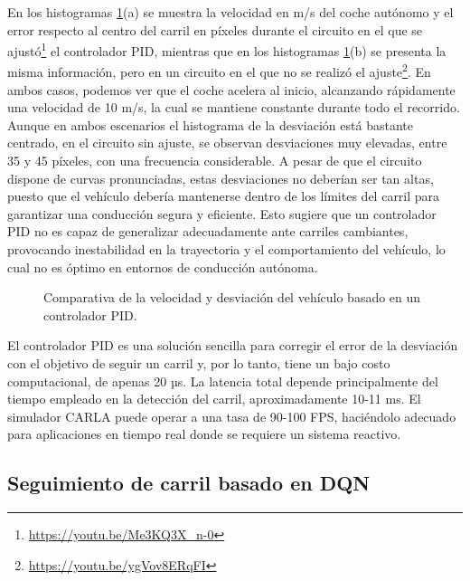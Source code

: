 En los histogramas \ref{fig:comparativa_pid}(a) se muestra la velocidad en m/s del coche autónomo y el error respecto al centro del carril en píxeles durante el circuito en el que se ajustó\footnote{\url{https://youtu.be/Me3KQ3X_n-0}} el controlador \ac{PID}, mientras que en los histogramas \ref{fig:comparativa_pid}(b) se presenta la misma información, pero en un circuito en el que no se realizó el ajuste\footnote{\url{https://youtu.be/ygVov8ERqFI}}. En ambos casos, podemos ver que el coche acelera al inicio, alcanzando rápidamente una velocidad de 10 m/s, la cual se mantiene constante durante todo el recorrido. Aunque en ambos escenarios el histograma de la desviación está bastante centrado, en el circuito sin ajuste, se observan desviaciones muy elevadas, entre 35 y 45 píxeles, con una frecuencia considerable. A pesar de que el circuito dispone de curvas pronunciadas, estas desviaciones no deberían ser tan altas, puesto que el vehículo debería mantenerse dentro de los límites del carril para garantizar una conducción segura y eficiente. Esto sugiere que un controlador \ac{PID} no es capaz de generalizar adecuadamente ante carriles cambiantes, provocando inestabilidad en la trayectoria y el comportamiento del vehículo, lo cual no es óptimo en entornos de conducción autónoma.

\begin{figure}[ht]
\centering
{}
\hfill
{}
\caption{Comparativa de la velocidad y desviación del vehículo basado en un controlador \ac{PID}.}
\label{fig:comparativa_pid}
\end{figure}

El controlador \ac{PID} es una solución sencilla para corregir el error de la desviación con el objetivo de seguir un carril y, por lo tanto, tiene un bajo costo computacional, de apenas 20 µs. La latencia total depende principalmente del tiempo empleado en la detección del carril, aproximadamente 10-11 ms. El simulador CARLA puede operar a una tasa de 90-100 \ac{FPS}, haciéndolo adecuado para aplicaciones en tiempo real donde se requiere un sistema reactivo.

\subsection{Seguimiento de carril basado en \ac{DQN}}

